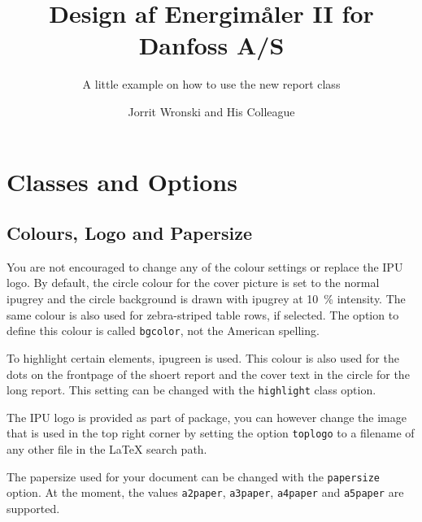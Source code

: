 \documentclass[short,comm]{ipureport}
\title{Design af Energimåler II for Danfoss A/S}
\subtitle{A little example on how to use the new report class}
\author{Jorrit Wronski and His Colleague}
\begin{document}


\maketitle



\tableofcontents
\listoftodos

\cleardoublepage
\section{Classes and Options}

\subsection{Colours, Logo and Papersize}

You are not encouraged to change any of the colour settings or replace the IPU logo. By default, the circle colour for the cover picture is set to the normal ipugrey and the circle background is drawn with ipugrey at \SI{10}{\percent} intensity. The same colour is also used for zebra-striped table rows, if selected. The option to define this colour is called \texttt{bgcolor}, not the American spelling. 

To highlight certain elements, ipugreen is used. This colour is also used for the dots on the frontpage of the shoert report and the cover text in the circle for the long report. This setting can be changed with the \texttt{highlight} class option.

The IPU logo is provided as part of package, you can however change the image that is used in the top right corner by setting the option \texttt{toplogo} to a filename of any other file in the \LaTeX{} search path. 


The papersize used for your document can be changed with the \texttt{papersize} option. At the moment, the values \texttt{a2paper}, \texttt{a3paper}, \texttt{a4paper} and \texttt{a5paper} are supported. 
\end{document}
